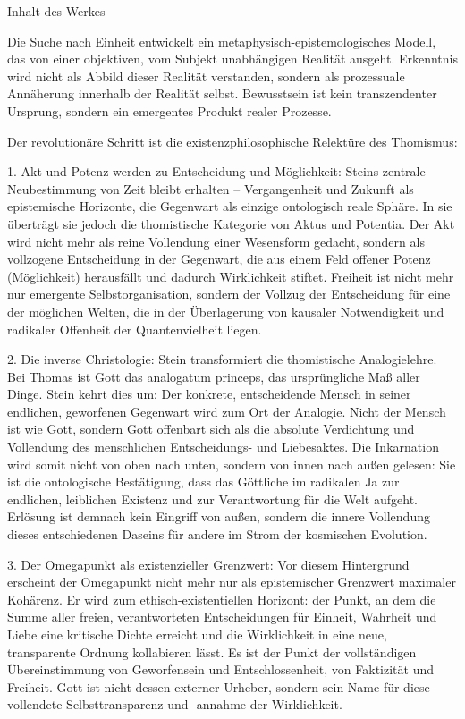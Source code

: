 \documentclass[
]{article}
\begin{document}
Inhalt des Werkes

Die Suche nach Einheit entwickelt ein metaphysisch-epistemologisches Modell, das von einer objektiven, vom Subjekt unabhängigen Realität ausgeht. Erkenntnis wird nicht als Abbild dieser Realität verstanden, sondern als prozessuale Annäherung innerhalb der Realität selbst. Bewusstsein ist kein transzendenter Ursprung, sondern ein emergentes Produkt realer Prozesse.

Der revolutionäre Schritt ist die existenzphilosophische Relektüre des Thomismus:

1. Akt und Potenz werden zu Entscheidung und Möglichkeit: Steins zentrale Neubestimmung von Zeit bleibt erhalten -- Vergangenheit und Zukunft als epistemische Horizonte, die Gegenwart als einzige ontologisch reale Sphäre. In sie überträgt sie jedoch die thomistische Kategorie von Aktus und Potentia. Der Akt wird nicht mehr als reine Vollendung einer Wesensform gedacht, sondern als vollzogene Entscheidung in der Gegenwart, die aus einem Feld offener Potenz (Möglichkeit) herausfällt und dadurch Wirklichkeit stiftet. Freiheit ist nicht mehr nur emergente Selbstorganisation, sondern der Vollzug der Entscheidung für eine der möglichen Welten, die in der Überlagerung von kausaler Notwendigkeit und radikaler Offenheit der Quantenvielheit liegen.

2. Die inverse Christologie: Stein transformiert die thomistische Analogielehre. Bei Thomas ist Gott das analogatum princeps, das ursprüngliche Maß aller Dinge. Stein kehrt dies um: Der konkrete, entscheidende Mensch in seiner endlichen, geworfenen Gegenwart wird zum Ort der Analogie. Nicht der Mensch ist wie Gott, sondern Gott offenbart sich als die absolute Verdichtung und Vollendung des menschlichen Entscheidungs- und Liebesaktes. Die Inkarnation wird somit nicht von oben nach unten, sondern von innen nach außen gelesen: Sie ist die ontologische Bestätigung, dass das Göttliche im radikalen Ja zur endlichen, leiblichen Existenz und zur Verantwortung für die Welt aufgeht. Erlösung ist demnach kein Eingriff von außen, sondern die innere Vollendung dieses entschiedenen Daseins für andere im Strom der kosmischen Evolution.

3. Der Omegapunkt als existenzieller Grenzwert: Vor diesem Hintergrund erscheint der Omegapunkt nicht mehr nur als epistemischer Grenzwert maximaler Kohärenz. Er wird zum ethisch-existentiellen Horizont: der Punkt, an dem die Summe aller freien, verantworteten Entscheidungen für Einheit, Wahrheit und Liebe eine kritische Dichte erreicht und die Wirklichkeit in eine neue, transparente Ordnung kollabieren lässt. Es ist der Punkt der vollständigen Übereinstimmung von Geworfensein und Entschlossenheit, von Faktizität und Freiheit. Gott ist nicht dessen externer Urheber, sondern sein Name für diese vollendete Selbsttransparenz und -annahme der Wirklichkeit.
\end{document}
